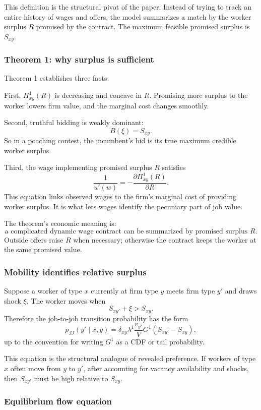 \documentclass[11pt]{article}
\newcommand{\1}{\mathbf{1}}
\begin{document}
This definition is the structural pivot of the paper. Instead of trying to track an entire history of wages and offers, the model summarizes a match by the worker surplus $R$ promised by the contract. The maximum feasible promised surplus is $S_{xy}$.

\subsubsection*{Theorem 1: why surplus is sufficient}

Theorem 1 establishes three facts.

First, $\Pi^1_{xy}(R)$ is decreasing and concave in $R$. Promising more surplus to the worker lowers firm value, and the marginal cost changes smoothly.

Second, truthful bidding is weakly dominant:
\[
B(\xi)=S_{xy}.
\]
So in a poaching contest, the incumbent's bid is its true maximum credible worker surplus.

Third, the wage implementing promised surplus $R$ satisfies
\[
\boxed{
\frac{1}{u'(w)}
=
-\frac{\partial \Pi^1_{xy}(R)}{\partial R}.
}
\]
This equation links observed wages to the firm's marginal cost of providing worker surplus. It is what lets wages identify the pecuniary part of job value.

The theorem's economic meaning is:
\[
\boxed{
\text{a complicated dynamic wage contract can be summarized by promised surplus }R.
}
\]
Outside offers raise $R$ when necessary; otherwise the contract keeps the worker at the same promised value.

\subsubsection*{Mobility identifies relative surplus}

Suppose a worker of type $x$ currently at firm type $y$ meets firm type $y'$ and draws shock $\xi$. The worker moves when
\[
S_{xy'}+\xi>S_{xy}.
\]
Therefore the job-to-job transition probability has the form
\[
\boxed{
p_{JJ}(y'\mid x,y)
=
\delta_{xy}\lambda^1\frac{v_{y'}}{V}
G^1(S_{xy'}-S_{xy}),
}
\]
up to the convention for writing $G^1$ as a CDF or tail probability.

This equation is the structural analogue of revealed preference. If workers of type $x$ often move from $y$ to $y'$, after accounting for vacancy availability and shocks, then $S_{xy'}$ must be high relative to $S_{xy}$.

\subsubsection*{Equilibrium flow equation}
\end{document}

